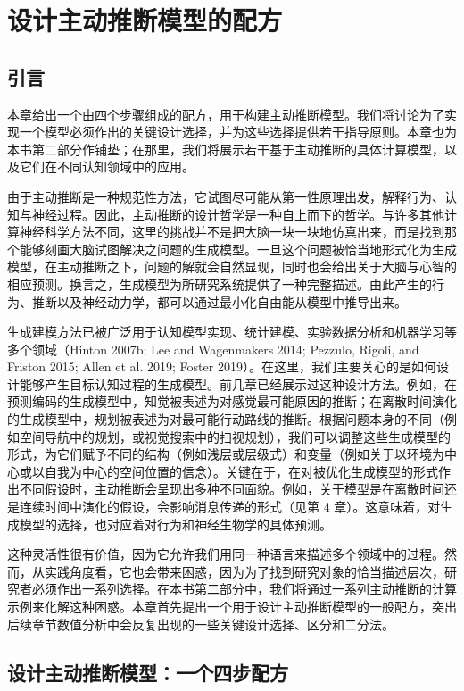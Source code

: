 \chapter{设计主动推断模型的配方}

\section{引言}

本章给出一个由四个步骤组成的配方，用于构建主动推断模型。我们将讨论为了实现一个模型必须作出的关键设计选择，并为这些选择提供若干指导原则。本章也为本书第二部分作铺垫；在那里，我们将展示若干基于主动推断的具体计算模型，以及它们在不同认知领域中的应用。

由于主动推断是一种规范性方法，它试图尽可能从第一性原理出发，解释行为、认知与神经过程。因此，主动推断的设计哲学是一种自上而下的哲学。与许多其他计算神经科学方法不同，这里的挑战并不是把大脑一块一块地仿真出来，而是找到那个能够刻画大脑试图解决之问题的生成模型。一旦这个问题被恰当地形式化为生成模型，在主动推断之下，问题的解就会自然显现，同时也会给出关于大脑与心智的相应预测。换言之，生成模型为所研究系统提供了一种完整描述。由此产生的行为、推断以及神经动力学，都可以通过最小化自由能从模型中推导出来。

生成建模方法已被广泛用于认知模型实现、统计建模、实验数据分析和机器学习等多个领域（Hinton 2007b; Lee and Wagenmakers 2014; Pezzulo, Rigoli, and Friston 2015; Allen et al. 2019; Foster 2019）。在这里，我们主要关心的是如何设计能够产生目标认知过程的生成模型。前几章已经展示过这种设计方法。例如，在预测编码的生成模型中，知觉被表述为对感觉最可能原因的推断；在离散时间演化的生成模型中，规划被表述为对最可能行动路线的推断。根据问题本身的不同（例如空间导航中的规划，或视觉搜索中的扫视规划），我们可以调整这些生成模型的形式，为它们赋予不同的结构（例如浅层或层级式）和变量（例如关于以环境为中心或以自我为中心的空间位置的信念）。关键在于，在对被优化生成模型的形式作出不同假设时，主动推断会呈现出多种不同面貌。例如，关于模型是在离散时间还是连续时间中演化的假设，会影响消息传递的形式（见第 4 章）。这意味着，对生成模型的选择，也对应着对行为和神经生物学的具体预测。

这种灵活性很有价值，因为它允许我们用同一种语言来描述多个领域中的过程。然而，从实践角度看，它也会带来困惑，因为为了找到研究对象的恰当描述层次，研究者必须作出一系列选择。在本书第二部分中，我们将通过一系列主动推断的计算示例来化解这种困惑。本章首先提出一个用于设计主动推断模型的一般配方，突出后续章节数值分析中会反复出现的一些关键设计选择、区分和二分法。

\section{设计主动推断模型：一个四步配方}

